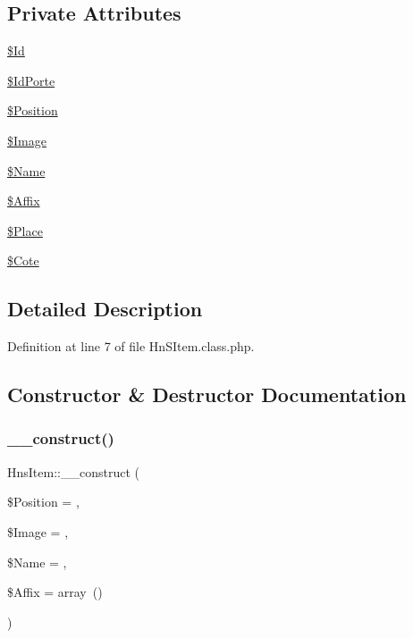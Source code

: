 \subsection*{Private Attributes}
\begin{DoxyCompactItemize}
\item 
\hyperlink{class_hns_item_a590c35ef1a0edb5d297dedb61f0447f4}{\$\+Id}
\item 
\hyperlink{class_hns_item_a72a61a0a1d00bbbdf43414375638eefd}{\$\+Id\+Porte}
\item 
\hyperlink{class_hns_item_a2d7e735a253f4199871220b46d1c1f66}{\$\+Position}
\item 
\hyperlink{class_hns_item_ab5f9d8b7d7527dc6fe11aff261ff47ab}{\$\+Image}
\item 
\hyperlink{class_hns_item_abb2c7380eb194c1e4ddb4524b84140bb}{\$\+Name}
\item 
\hyperlink{class_hns_item_a60301d7055c910c2005ea444002d9acf}{\$\+Affix}
\item 
\hyperlink{class_hns_item_aacf61241fd4f77d717df7c3074adb920}{\$\+Place}
\item 
\hyperlink{class_hns_item_afffb8edfc8cc88dbaccbd6ad8358f358}{\$\+Cote}
\end{DoxyCompactItemize}


\subsection{Detailed Description}


Definition at line 7 of file Hn\+S\+Item.\+class.\+php.



\subsection{Constructor \& Destructor Documentation}
\mbox{\label{class_hns_item_ace799b6ba81686427503fd42b945979a}} 
\subsubsection{\texorpdfstring{\+\_\+\+\_\+construct()}{\_\_construct()}}
{\footnotesize\ttfamily Hns\+Item\+::\+\_\+\+\_\+construct (\begin{DoxyParamCaption}\item[{}]{\$\+Position = {\ttfamily \textquotesingle{}\textquotesingle{}},  }\item[{}]{\$\+Image = {\ttfamily \textquotesingle{}\textquotesingle{}},  }\item[{}]{\$\+Name = {\ttfamily \textquotesingle{}\textquotesingle{}},  }\item[{}]{\$\+Affix = {\ttfamily array~()} }\end{DoxyParamCaption})}



